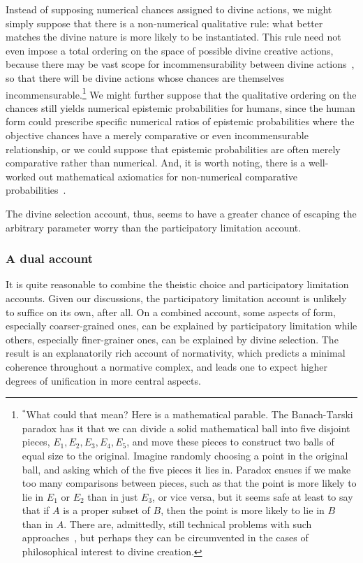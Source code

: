Instead of supposing numerical chances assigned to divine actions, we might simply suppose that there is a non-numerical qualitative 
rule: what better matches the divine nature is more likely to be instantiated. This rule need not even impose a total ordering on the
space of possible divine creative actions, because there may be vast scope for incommensurability between divine actions~\parencite{PrussCreation},
so that there will be divine actions whose chances are themselves incommensurable.\footnote{$^*$What could that mean? Here is a mathematical
parable. The Banach-Tarski paradox has it that we can divide a solid mathematical ball into five disjoint pieces, $E_1,E_2,E_3,E_4,E_5$, and move these pieces to 
construct two balls of equal size to the original. Imagine randomly choosing a point in the original ball, and asking which of the
five pieces it lies in. Paradox ensues if we make too many comparisons between pieces, such as that the point is more likely to lie in 
$E_1$ or $E_2$ than in just $E_3$, or vice versa, but it seems safe at least to say that if $A$ is a proper subset of $B$, then the point is more likely to lie in $B$ than
in $A$. There are, admittedly, still technical problems with such approaches~\parencite{PrussRotation}, but perhaps
they can be circumvented in the cases of philosophical interest to divine creation.} 
We might further suppose that the qualitative ordering on the chances still yields numerical epistemic probabilities for humans, since the human form could prescribe specific numerical ratios of epistemic probabilities where the objective chances
have a merely comparative or even incommensurable relationship, or we could suppose that epistemic probabilities
are often merely comparative rather than numerical. And, it is worth noting, there is a well-worked
out mathematical axiomatics for non-numerical comparative probabilities~\parencite{KLST}.

The divine selection account, thus, seems to have a greater chance of escaping the arbitrary parameter worry than the 
participatory limitation account.

\subsubsection{A dual account}
It is quite reasonable to combine the theistic choice and participatory limitation accounts. Given our discussions, 
the participatory limitation account is unlikely to suffice on its own, after all.
On a combined account, some aspects of form, especially coarser-grained ones, can be explained by participatory 
limitation while others, especially finer-grainer ones, can be explained by divine selection. The result is an explanatorily rich account of 
normativity, which predicts a minimal coherence throughout a normative complex, and leads one to expect higher degrees of unification
in more central aspects.


